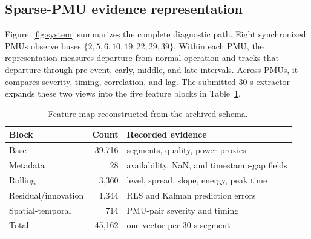 \documentclass[conference]{IEEEtran}
\begin{document}
\subsection{Sparse-PMU evidence representation}
Figure~\ref{fig:system} summarizes the complete diagnostic path. Eight synchronized PMUs observe buses $\{2,5,6,10,19,22,29,39\}$. Within each PMU, the representation measures departure from normal operation and tracks that departure through pre-event, early, middle, and late intervals. Across PMUs, it compares severity, timing, correlation, and lag. The submitted 30-s extractor expands these two views into the five feature blocks in Table~\ref{tab:featuremap}.

\begin{table}[!t]
\centering
\caption{Feature map reconstructed from the archived schema.}
\label{tab:featuremap}
\scriptsize
\setlength{\tabcolsep}{3pt}
\begin{tabular}{@{}lrl@{}}
\toprule
\textbf{Block} & \textbf{Count} & \textbf{Recorded evidence} \\
\midrule
Base & 39,716 & segments, quality, power proxies \\
Metadata & 28 & availability, NaN, and timestamp-gap fields \\
Rolling & 3,360 & level, spread, slope, energy, peak time \\
Residual/innovation & 1,344 & RLS and Kalman prediction errors \\
Spatial-temporal & 714 & PMU-pair severity and timing \\
\midrule
Total & 45,162 & one vector per 30-s segment \\
\bottomrule
\end{tabular}
\end{table}
\end{document}
